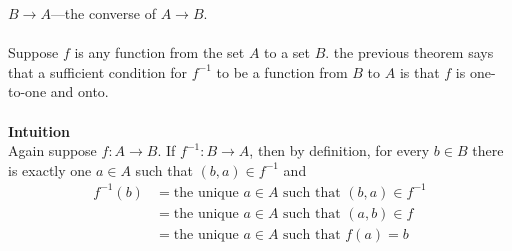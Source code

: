 \documentclass{report}
\theoremstyle{definition}
\begin{document}
$B\to A$---the converse of $A\to B$.\\
\vspace{1mm}\\
Suppose $f$ is any function from the set $A$ to a set $B$. the previous theorem says that a sufficient condition for $f^{-1}$ to be a function from $B$ to $A$ is that $f$ is one-to-one and onto.\\
\vspace{1mm}\\
\textbf{Intuition}\\
Again suppose $f:A\to B$. If $f^{-1}:B\to A$, then by definition, for every $b\in B$ there is exactly one $a\in A$ such that
$(b,a)\in f^{-1}$ and
\begin{align*}
f^{-1}(b)&=\text{the unique $a\in A$ such that }(b,a)\in f^{-1}\\
&=\text{the unique $a\in A$ such that }(a,b)\in f\\
&=\text{the unique $a\in A$ such that }f(a)=b
\end{align*}
\newpage
\end{document}
